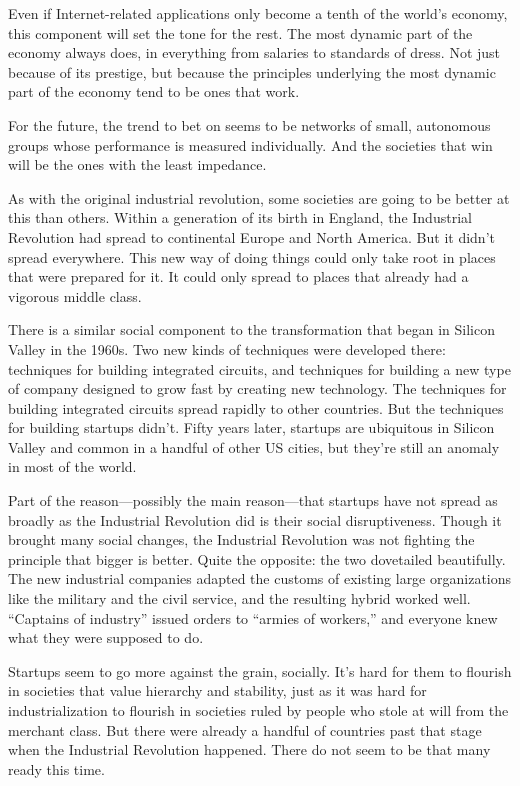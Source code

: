 \documentclass[12pt]{book}
\begin{document}
Even if Internet-related applications only become a tenth of the world's
economy, this component will set the tone for the rest. The most dynamic
part of the economy always does, in everything from salaries to
standards of dress. Not just because of its prestige, but because the
principles underlying the most dynamic part of the economy tend to be
ones that work.

For the future, the trend to bet on seems to be networks of small,
autonomous groups whose performance is measured individually. And the
societies that win will be the ones with the least impedance.

As with the original industrial revolution, some societies are going to
be better at this than others. Within a generation of its birth in
England, the Industrial Revolution had spread to continental Europe and
North America. But it didn't spread everywhere. This new way of doing
things could only take root in places that were prepared for it. It
could only spread to places that already had a vigorous middle class.

There is a similar social component to the transformation that began in
Silicon Valley in the 1960s. Two new kinds of techniques were developed
there: techniques for building integrated circuits, and techniques for
building a new type of company designed to grow fast by creating new
technology. The techniques for building integrated circuits spread
rapidly to other countries. But the techniques for building startups
didn't. Fifty years later, startups are ubiquitous in Silicon Valley and
common in a handful of other US cities, but they're still an anomaly in
most of the world.

Part of the reason---possibly the main reason---that startups have not
spread as broadly as the Industrial Revolution did is their social
disruptiveness. Though it brought many social changes, the Industrial
Revolution was not fighting the principle that bigger is better. Quite
the opposite: the two dovetailed beautifully. The new industrial
companies adapted the customs of existing large organizations like the
military and the civil service, and the resulting hybrid worked well.
``Captains of industry'' issued orders to ``armies of workers,'' and
everyone knew what they were supposed to do.

Startups seem to go more against the grain, socially. It's hard for them
to flourish in societies that value hierarchy and stability, just as it
was hard for industrialization to flourish in societies ruled by people
who stole at will from the merchant class. But there were already a
handful of countries past that stage when the Industrial Revolution
happened. There do not seem to be that many ready this time.
\end{document}
